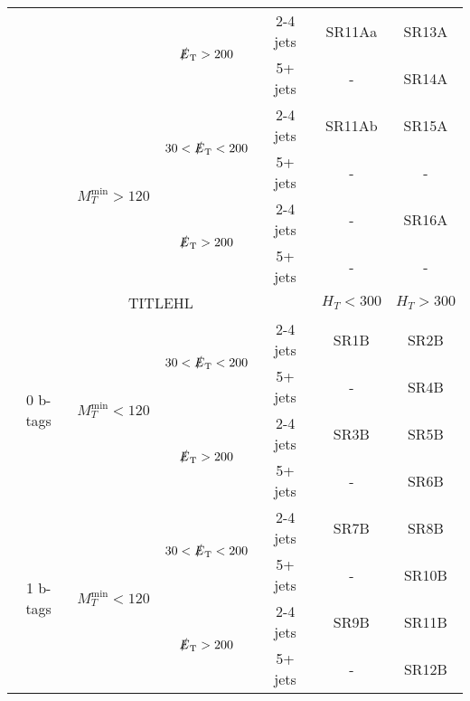 \documentclass[plain,landscape]{article}
\newcommand{\met}{\slashed{E}_\mathrm{T}}
\begin{document}
\begin{table}
\begin{tabular}{|c|c|c|c|c|c|}
                             &                                             & \multirow{2}{*}{ $\met > 200$}               & 2-4 jets    & SR11Aa                  & SR13A  \\ \cline{4-6}
                             &                                             &                                              & 5+ jets     & -                       & SR14A  \\ \cline{2-6}
                             & \multirow{4}{*}{$M_T^{\textrm{min}} > 120$} & \multirow{2}{*}{ ${\color{black} 30} < \met < 200$} & 2-4 jets    & SR11Ab                  & SR15A  \\ \cline{4-6}
                             &                                             &                                              & 5+ jets     & -                       & - \\ \cline{3-6}
                             &                                             & \multirow{2}{*}{ $\met > 200$}               & 2-4 jets    & -                       & SR16A \\ \cline{4-6}
                             &                                             &                                              & 5+ jets     & -                       & - \\ \cline{1-6}
\hline \hline
\multicolumn{4}{|c|}{  TITLEHL  }                      & $H_T < 300$ & $ H_T > 300$  \\ \hline
\multirow{4}{*}{0 b-tags}  & \multirow{4}{*}{$M_T^{\textrm{min}} < 120$} & \multirow{2}{*}{${\color{black} 30} < \met < 200$}  & 2-4 jets & SR1B        & SR2B \\ \cline{4-6}
                           &                                             &                                              & 5+ jets  & -           & SR4B  \\ \cline{3-6}
                           &                                             & \multirow{2}{*}{$\met > 200$}                & 2-4 jets & SR3B        & SR5B  \\ \cline{4-6}
                           &                                             &                                              & 5+ jets  & -           & SR6B   \\ \cline{1-6}
\multirow{4}{*}{1 b-tags}  & \multirow{4}{*}{$M_T^{\textrm{min}} < 120$} & \multirow{2}{*}{ ${\color{black} 30} < \met < 200$} & 2-4 jets & SR7B        & SR8B  \\ \cline{4-6}
                           &                                             &                                              & 5+ jets  & -           & SR10B  \\ \cline{3-6}
                           &                                             & \multirow{2}{*}{ $\met > 200$}               & 2-4 jets & SR9B        & SR11B  \\ \cline{4-6}
                           &                                             &                                              & 5+ jets  & -           & SR12B  \\ \cline{1-6}
\end{tabular}
\end{table}
\end{document}
